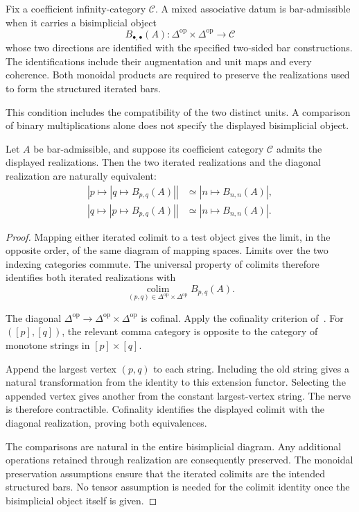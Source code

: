 \begin{definition}
\label{cbc:bars:mixed-admissible}
Fix a coefficient infinity-category $\mathcal C$. A mixed associative datum is bar-admissible when it carries a bisimplicial object
\[
 B_{\bullet,\bullet}(A):
 \Delta^{\mathrm{op}}\times\Delta^{\mathrm{op}}\longrightarrow\mathcal C
\]
whose two directions are identified with the specified two-sided bar constructions. The identifications include their augmentation and unit maps and every coherence. Both monoidal products are required to preserve the realizations used to form the structured iterated bars.
\end{definition}

This condition includes the compatibility of the two distinct units. A comparison of binary multiplications alone does not specify the displayed bisimplicial object.

\begin{theorem}\label{cbc:bars:fubini}
Let $A$ be bar-admissible, and suppose its coefficient category $\mathcal C$ admits the displayed realizations. Then the two iterated realizations and the diagonal realization are naturally equivalent:
\begin{align*}
 \left|p\longmapsto\left|q\longmapsto B_{p,q}(A)\right|\right|
 &\simeq\left|n\longmapsto B_{n,n}(A)\right|,\\
 \left|q\longmapsto\left|p\longmapsto B_{p,q}(A)\right|\right|
 &\simeq\left|n\longmapsto B_{n,n}(A)\right|.
\end{align*}
\end{theorem}
\begin{proof}
Mapping either iterated colimit to a test object gives the limit, in the opposite order, of the same diagram of mapping spaces. Limits over the two indexing categories commute. The universal property of colimits therefore identifies both iterated realizations with
\[
 \operatorname*{colim}_{(p,q)\in\Delta^{\mathrm{op}}\times\Delta^{\mathrm{op}}}
 B_{p,q}(A).
\]

The diagonal $\Delta^{\mathrm{op}}\to\Delta^{\mathrm{op}}\times\Delta^{\mathrm{op}}$ is cofinal. Apply the cofinality criterion of~\cite[Theorem~4.1.3.1]{LurieHTT}. For $([p],[q])$, the relevant comma category is opposite to the category of monotone strings in $[p]\times[q]$.

Append the largest vertex $(p,q)$ to each string. Including the old string gives a natural transformation from the identity to this extension functor. Selecting the appended vertex gives another from the constant largest-vertex string. The nerve is therefore contractible. Cofinality identifies the displayed colimit with the diagonal realization, proving both equivalences.

The comparisons are natural in the entire bisimplicial diagram. Any additional operations retained through realization are consequently preserved. The monoidal preservation assumptions ensure that the iterated colimits are the intended structured bars. No tensor assumption is needed for the colimit identity once the bisimplicial object itself is given.
\end{proof}


